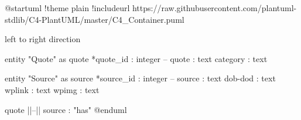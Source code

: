@startuml
!theme plain
!includeurl https://raw.githubusercontent.com/plantuml-stdlib/C4-PlantUML/master/C4_Container.puml

left to right direction

entity "Quote" as quote {
  *quote_id : integer
  --
  quote : text
  category : text
}

entity "Source" as source {
  *source_id : integer
  --
  source : text
  dob-dod : text
  wplink : text
  wpimg : text
}

quote ||--|| source : "has"
@enduml

